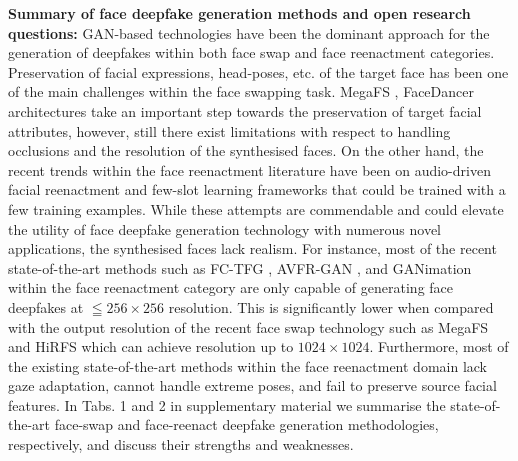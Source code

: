 
\noindent\textbf{Summary of face deepfake generation methods and open research questions:} GAN-based technologies have been the dominant approach for the generation of deepfakes within both face swap and face reenactment categories. Preservation of facial expressions, head-poses, etc. of the target face has been one of the main challenges within the face swapping task. MegaFS \cite{zhu2021one}, FaceDancer \cite{rosberg2023facedancer} architectures take an important step towards the preservation of target facial attributes, however, still there exist limitations with respect to handling occlusions and the resolution of the synthesised faces. On the other hand, the recent trends within the face reenactment literature have been on audio-driven facial reenactment and few-slot learning frameworks that could be trained with a few training examples. While these attempts are commendable and could elevate the utility of face deepfake generation technology with numerous novel applications, the synthesised faces lack realism. For instance, most of the recent state-of-the-art methods such as FC-TFG \cite{jang2023s}, AVFR-GAN \cite{agarwal2023audio}, and GANimation \cite{pumarola2018ganimation} within the face reenactment category are only capable of generating face deepfakes at $\leqq 256 \times 256$ resolution. This is significantly lower when compared with the output resolution of the recent face swap technology such as MegaFS \cite{zhu2021one} and HiRFS \cite{xu2022high} which can achieve resolution up to $1024 \times 1024$. Furthermore, most of the existing state-of-the-art methods within the face reenactment domain lack gaze adaptation, cannot handle extreme poses, and fail to preserve source facial features. In Tabs. 1 and 2 in supplementary material we summarise the state-of-the-art face-swap and face-reenact deepfake generation methodologies, respectively, and discuss their strengths and weaknesses. 


